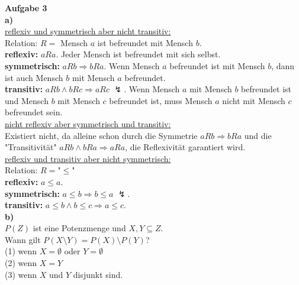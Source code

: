 \documentclass[a4paper]{scrartcl}
\begin{document}
	\begin{flushleft}
		\textbf{Aufgabe 3}\\
		\textbf{a)} \\
		\underline{reflexiv und symmetrisch aber nicht transitiv:}\\
		Relation: $R =$ Mensch $a$ ist befreundet mit Mensch $b$.\\
		\textbf{reflexiv:} $aRa$. Jeder Mensch ist befreundet mit sich selbst.\\
		\textbf{symmetrisch:} $aRb \Rightarrow bRa$. Wenn Mensch $a$ befreundet ist mit Mensch $b$, dann ist auch Mensch $b$ mit Mensch $a$ befreundet.\\
		\textbf{transitiv:} $aRb \wedge bRc\Rightarrow aRc$ $\mathbb{\lightning}$. Wenn Mensch $a$ mit Mensch $b$ befreundet ist und Mensch $b$ mit Mensch $c$ befreundet ist, muss Mensch $a$ nicht mit Mensch $c$ befreundet sein.\\[1em]
		\underline{nicht reflexiv aber symmetrisch und transitiv:}\\
		Existiert nicht, da alleine schon durch die Symmetrie $aRb \Rightarrow bRa$ und die "Transitivität" $aRb \wedge bRa \Rightarrow aRa$, die Reflexivität garantiert wird.\\[1em]
		\underline{reflexiv und transitiv aber nicht symmetrisch:}\\
		Relation: $R=$"$\le$"\\
		\textbf{reflexiv:} $a\le a$.\\
		\textbf{symmetrisch:} $a\le b \Rightarrow b\le a$ $\mathbb{\lightning}$.\\
		\textbf{transitiv:} $a\le b \wedge b\le c\Rightarrow a\le c$.\\[1em]

		\textbf{b)} \\
		$P(Z)$ ist eine Potenzmenge und $X,Y \subseteq Z$.\\
		Wann gilt $P(X\setminus Y)=P(X)\setminus P(Y)$?\\
		(1) wenn $X=\emptyset$ oder $Y=\emptyset$\\
		(2) wenn $X=Y$\\
		(3) wenn $X$ und $Y$ disjunkt sind.\\[1em]
		
 	\end{flushleft}
\end{document}
